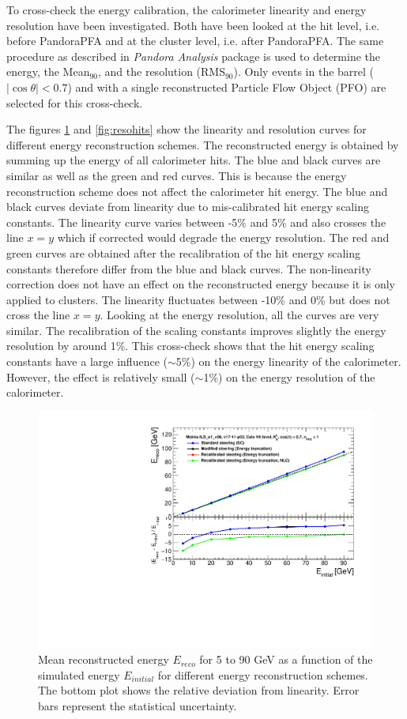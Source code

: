 To cross-check the energy calibration, the calorimeter linearity and energy resolution have been investigated. Both have been looked at the hit level, i.e. before PandoraPFA and at the cluster level, i.e. after PandoraPFA. The same procedure as described in \textit{Pandora Analysis} package is used to determine the energy, the Mean$_{90}$,  and the resolution (RMS$_{90}$). Only events in the barrel ($|\cos\theta| < 0.7$) and with a single reconstructed Particle Flow Object (PFO) are selected for this cross-check.

The figures \ref{fig:linhits} and \ref{fig:resohits} show the linearity and resolution curves for different energy reconstruction schemes. The reconstructed energy is obtained by summing up the energy of all calorimeter hits. The blue and black curves are similar as well as the green and red curves. This is because the energy reconstruction scheme does not affect the calorimeter hit energy. The blue and black curves deviate from linearity due to mis-calibrated hit energy scaling constants. The linearity curve varies between -5\% and 5\% and also crosses the line $x=y$ which if corrected would degrade the energy resolution. The red and green curves are obtained after the recalibration of the hit energy scaling constants therefore differ from the blue and black curves. The non-linearity correction does not have an effect on the reconstructed energy because it is only applied to clusters. The linearity fluctuates between -10\% and 0\% but does not cross the line $x=y$. Looking at the energy resolution, all the curves are very similar. The recalibration of the scaling constants improves slightly the energy resolution by around 1\%. This cross-check shows that the hit energy scaling constants have a large influence ($\sim$5\%) on the energy linearity of the calorimeter. However, the effect is relatively small ($\sim$1\%) on the energy resolution of the calorimeter.

\begin{figure}[htbp!]
  \centering
  \includegraphics[width=0.6\linewidth]{../Thesis_Plots/ILD/CheckCalib/Comparison_linearity_Curves_Hits}
  \caption{Mean reconstructed energy $E_{reco}$ for 5 to 90 GeV \kzeroL{} as a function of the simulated energy $E_{initial}$ for different energy reconstruction schemes. The bottom plot shows the relative deviation from linearity. Error bars represent the statistical uncertainty.} \label{fig:linhits}
\end{figure}


